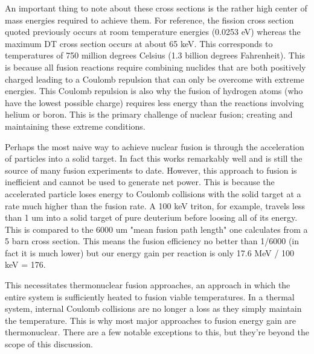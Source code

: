 	An important thing to note about these cross sections is the rather high center of mass energies required to achieve them. For reference, the fission cross section quoted previously occurs at room temperature energies (0.0253 eV) whereas the maximum DT cross section occurs at about 65 keV. This corresponds to temperatures of 750 million degrees Celsius (1.3 billion degrees Fahrenheit). This is because all fusion reactions require combining nuclides that are both positively charged leading to a Coulomb repulsion that can only be overcome with extreme energies. This Coulomb repulsion is also why the fusion of hydrogen atoms (who have the lowest possible charge) requires less energy than the reactions involving helium or boron. This is the primary challenge of nuclear fusion; creating and maintaining these extreme conditions. 
	
	Perhaps the most naive way to achieve nuclear fusion is through the acceleration of particles into a solid target. In fact this works remarkably well and is still the source of many fusion experiments to date. However, this approach to fusion is inefficient and cannot be used to generate net power. This is because the accelerated particle loses energy to Coulomb collisions with the solid target at a rate much higher than the fusion rate. A 100 keV triton, for example, travels less than 1 um into a solid target of pure deuterium before loosing all of its energy. This is compared to the 6000 um "mean fusion path length" one calculates from a 5 barn cross section. This means the fusion efficiency no better than 1/6000 (in fact it is much lower) but our energy gain per reaction is only 17.6 MeV / 100 keV = 176. 
	
	This necessitates thermonuclear fusion approaches, an approach in which the entire system is sufficiently heated to fusion viable temperatures. In a thermal system, internal Coulomb collisions are no longer a loss as they simply maintain the temperature. This is why most major approaches to fusion energy gain are thermonuclear. There are a few notable exceptions to this, but they're beyond the scope of this discussion. 
	
